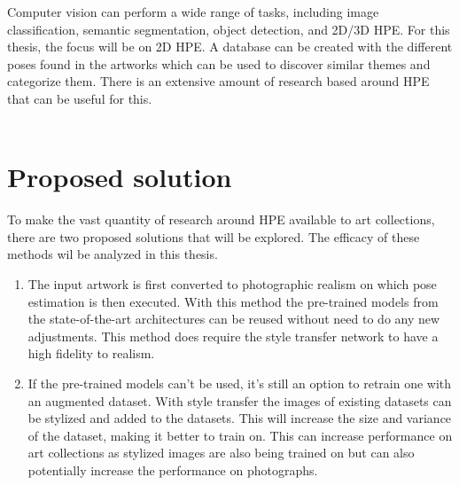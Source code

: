 Computer vision can perform a wide range of tasks, including image classification, semantic segmentation, object detection, and 2D/3D \gls{HPE}.
For this thesis, the focus will be on 2D HPE.
A database can be created with the different poses found in the artworks which can be used to discover similar themes and categorize them.
There is an extensive amount of research based around HPE that can be useful for this.
\\
\\

\section{Proposed solution}

To make the vast quantity of research around HPE available to art collections, there are two proposed solutions that will be explored.
The efficacy of these methods wil be analyzed in this thesis.

\begin{enumerate}
    \item The input artwork is first converted to photographic realism on which pose estimation is then executed.
With this method the pre-trained models from the state-of-the-art architectures can be reused without need to do any new adjustments.
This method does require the style transfer network to have a high fidelity to realism.
    \item If the pre-trained models can't be used, it's still an option to retrain one with an augmented dataset.
With style transfer the images of existing datasets can be stylized and added to the datasets.
This will increase the size and variance of the dataset, making it better to train on.
This can increase performance on art collections as stylized images are also being trained on but can also potentially increase the performance on photographs.
\end{enumerate}
